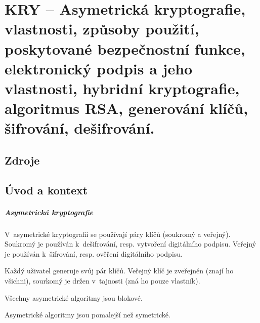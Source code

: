 

\graphicspath{{kry/asymetricka_kryptografie/figures}}


\chapter{KRY -- Asymetrická kryptografie, vlastnosti, způsoby použití, poskytované bezpečnostní funkce, elektronický podpis a jeho vlastnosti, hybridní kryptografie, algoritmus RSA, generování klíčů, šifrování, dešifrování.}



\section{Zdroje}

\begin{compactitem}
    \item {}
    \item {}
    \item {}
\end{compactitem}


\section{Úvod a kontext}

\paragraph*{Asymetrická kryptografie} \begin{compactitem}
    \item V~asymetrické kryptografii se používají páry klíčů (soukromý a veřejný). Soukromý je používán k~dešifrování, resp. vytvoření digitálního podpisu. Veřejný je používán k~šifrování, resp. ověření digitálního podpisu.
    \item Každý uživatel generuje svůj pár klíčů. Veřejný klíč je zveřejněn (znají ho všichni), sourkomý je držen v~tajnosti (zná ho pouze vlastník).
    \item Všechny asymetrické algoritmy jsou blokové.
    \item Asymetrické algoritmy jsou pomalejší než symetrické.
\end{compactitem}


